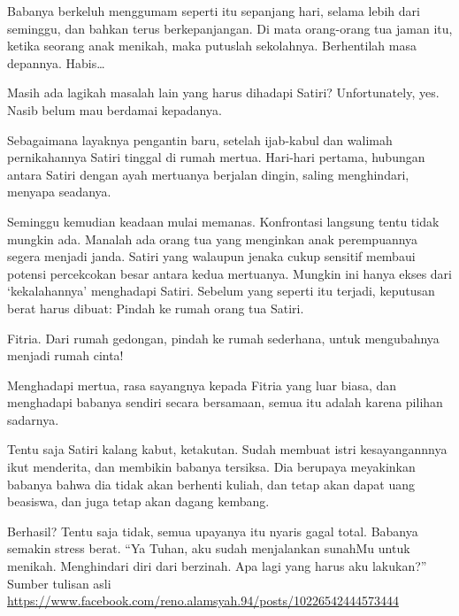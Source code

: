 Babanya berkeluh menggumam seperti itu sepanjang hari, selama lebih dari seminggu, dan bahkan terus berkepanjangan. Di mata orang-orang tua jaman itu, ketika seorang anak menikah, maka putuslah sekolahnya. Berhentilah masa depannya. Habis…

Masih ada lagikah masalah lain yang harus dihadapi Satiri? Unfortunately, yes. Nasib belum mau berdamai kepadanya.

Sebagaimana layaknya pengantin baru, setelah ijab-kabul dan walimah pernikahannya Satiri tinggal di rumah mertua. Hari-hari pertama, hubungan antara Satiri dengan ayah mertuanya berjalan dingin, saling menghindari, menyapa seadanya.

Seminggu kemudian keadaan mulai memanas. Konfrontasi langsung tentu tidak mungkin ada. Manalah ada orang tua yang menginkan anak perempuannya segera menjadi janda. Satiri yang walaupun jenaka cukup sensitif membaui potensi percekcokan besar antara kedua mertuanya. Mungkin ini hanya ekses dari ‘kekalahannya’ menghadapi Satiri. Sebelum yang seperti itu terjadi, keputusan berat harus dibuat: Pindah ke rumah orang tua Satiri.

Fitria. Dari rumah gedongan, pindah ke rumah sederhana, untuk mengubahnya menjadi rumah cinta!

Menghadapi mertua, rasa sayangnya kepada Fitria yang luar biasa, dan menghadapi babanya sendiri secara bersamaan, semua itu adalah karena pilihan sadarnya.

Tentu saja Satiri kalang kabut, ketakutan. Sudah membuat istri kesayangannnya ikut menderita, dan membikin babanya tersiksa. Dia berupaya meyakinkan babanya bahwa dia tidak akan berhenti kuliah, dan tetap akan dapat uang beasiswa, dan juga tetap akan dagang kembang.

Berhasil? Tentu saja tidak, semua upayanya itu nyaris gagal total. Babanya semakin stress berat. “Ya Tuhan, aku sudah menjalankan sunahMu untuk menikah. Menghindari diri dari berzinah. Apa lagi yang harus aku lakukan?”
\\[10pt]


Sumber tulisan asli \url{https://www.facebook.com/reno.alamsyah.94/posts/10226542444573444}

